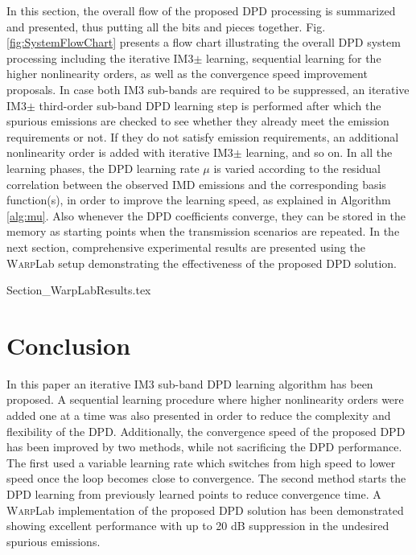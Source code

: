 \documentclass[9pt,conference]{IEEEtran}
\begin{document}
\begin{spacing}{0.88}
In this section, the overall flow of the proposed DPD processing is summarized and presented, thus putting all the bits and pieces together. Fig. \ref{fig:SystemFlowChart} presents a flow chart illustrating the overall DPD system processing including the iterative IM3$\pm$ learning, sequential learning for the higher nonlinearity orders, as well as the convergence speed improvement proposals. In case both IM3 sub-bands are required to be suppressed, an iterative IM3$\pm$ third-order sub-band DPD learning step is performed after which the spurious emissions are checked to see whether they already meet the emission requirements or not. If they do not satisfy emission requirements, an additional nonlinearity order is added with iterative IM3$\pm$ learning, and so on. In all the learning phases, the DPD learning rate $\mu$ is varied according to the residual correlation between the observed IMD emissions and the corresponding basis function(s), in order to improve the learning speed, as explained in Algorithm \ref{alg:mu}. Also whenever the DPD coefficients converge, they can be stored in the memory as starting points when the transmission scenarios are repeated. In the next section, comprehensive experimental results are presented using the \textsc{Warp}Lab setup demonstrating the effectiveness of the proposed DPD solution.

{Section_WarpLabResults.tex}

\section{Conclusion}
In this paper an iterative IM3 sub-band DPD learning algorithm has been proposed. A sequential learning procedure where higher nonlinearity orders were added one at a time was also presented in order to reduce the complexity and flexibility of the DPD. Additionally, the convergence speed of the proposed DPD has been improved by two methods, while not sacrificing the DPD performance. The first used a variable learning rate which switches from high speed to lower speed once the loop becomes close to convergence. The second method starts the DPD learning from previously learned points to reduce convergence time. A \textsc{Warp}Lab implementation of the proposed DPD solution has been demonstrated showing excellent performance with up to 20 dB suppression in the undesired spurious emissions.


\end{spacing}


\end{document}
